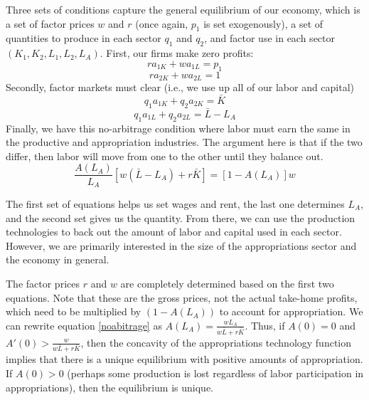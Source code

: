 Three sets of conditions capture the general equilibrium of our economy, which is a set of factor prices $w$ and $r$ (once again, $p_1$ is set exogenously), a set of quantities to produce in each sector $q_1$ and $q_2$, and factor use in each sector $(K_1,K_2,L_1,L_2,L_A)$. First, our firms make zero profits:
\begin{equation}\label{eq:p_1rw}
    ra_{1K} + wa_{1L} = p_1
\end{equation}
\begin{equation}\label{eq:rw2}
    ra_{2K} + wa_{2L} = 1
\end{equation}
Secondly, factor markets must clear (i.e., we use up all of our labor and capital)
\begin{equation}\label{eq:Kclear}
    q_1 a_{1K} + q_2 a_{2K} = \bar{K}
\end{equation}
\begin{equation}\label{eq:Lclear}
    q_1 a_{1L} + q_2 a_{2L} =\bar{L} - L_A
\end{equation}
Finally, we have this no-arbitrage condition where labor must earn the same in the productive and appropriation industries. The argument here is that if the two differ, then labor will move from one to the other until they balance out.
\begin{equation}\label{noabitrage}
    \frac{A(L_A)}{L_A}[w(\bar{L} - L_A) + r\bar{K}] = [1 - A(L_A)]w
\end{equation}

The first set of equations helps us set wages and rent, the last one determines $L_A$, and the second set gives us the quantity. From there, we can use the production technologies to back out the amount of labor and capital used in each sector. However, we are primarily interested in the size of the appropriations sector and the economy in general.

The factor prices $r$ and $w$ are completely determined based on the first two equations. Note that these are the gross prices, not the actual take-home profits, which need to be multiplied by $(1 - A(L_A))$ to account for appropriation. We can rewrite equation \ref{noabitrage} as $A(L_A) = \frac{wL_A}{w\bar{L} + r\bar{K}}$. Thus, if $A(0) = 0$ and $A'(0) >\frac{w}{w\bar{L} + r\bar{K}}$, then the concavity of the appropriations technology function implies that there is a unique equilibrium with positive amounts of appropriation. If $A(0) > 0$ (perhaps some production is lost regardless of labor participation in appropriations), then the equilibrium is unique.

